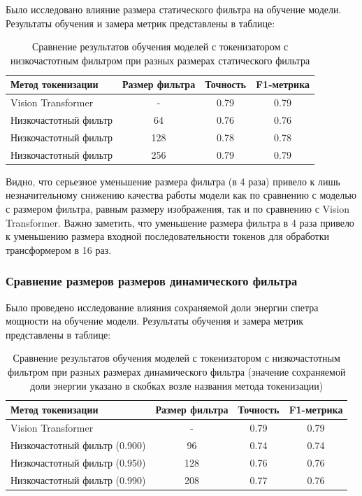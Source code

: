 \documentclass[times,specification,annotation]{itmo-student-thesis}
\begin{document}
Было исследовано влияние размера статического фильтра на обучение модели. Результаты обучения и замера метрик представлены в таблице:

\begin{table}[H]
  \centering
  \caption{Сравнение результатов обучения моделей с токенизатором с низкочастотным фильтром при разных размерах статического фильтра}
  \label{tab:fft-tokenization-static}
  \begin{tabular}{|l|c|c|c|}
    \hline
    Метод токенизации & Размер фильтра & Точность & F1-метрика \\ \hline
    Vision Transformer & - & 0.79 & 0.79 \\
    Низкочастотный фильтр & 64 & 0.76 & 0.76 \\
    Низкочастотный фильтр & 128 & 0.78 & 0.78 \\
    Низкочастотный фильтр & 256 & 0.79 & 0.79 \\
    \hline
  \end{tabular}
\end{table}

Видно, что серьезное уменьшение размера фильтра (в 4 раза) привело к лишь незначительному снижению качества работы модели как по сравнению с моделью с размером фильтра, равным размеру изображения, так и по сравнению с Vision Transformer. Важно заметить, что уменьшение размера фильтра в 4 раза привело к уменьшению размера входной последовательности токенов для обработки трансформером в 16 раз. 

\subsubsection{Сравнение размеров размеров динамического фильтра}

Было проведено исследование влияния сохраняемой доли энергии спетра мощности на обучение модели. Результаты обучения и замера метрик представлены в таблице:

\begin{table}[H]
  \centering
  \caption{Сравнение результатов обучения моделей с токенизатором с низкочастотным фильтром при разных размерах динамического фильтра (значение сохраняемой доли энергии указано в скобках возле названия метода токенизации)}
  \label{tab:fft-tokenization-dynamic}
  \begin{tabular}{|l|c|c|c|}
    \hline
    Метод токенизации & Размер фильтра & Точность & F1-метрика \\ \hline
    Vision Transformer & - & 0.79 & 0.79 \\
    Низкочастотный фильтр (0.900) & 96 & 0.74 & 0.74 \\
    Низкочастотный фильтр (0.950) & 128 & 0.76 & 0.76 \\
    Низкочастотный фильтр (0.990) & 208 & 0.77 & 0.76 \\
    \hline
  \end{tabular}
\end{table}
\end{document}
